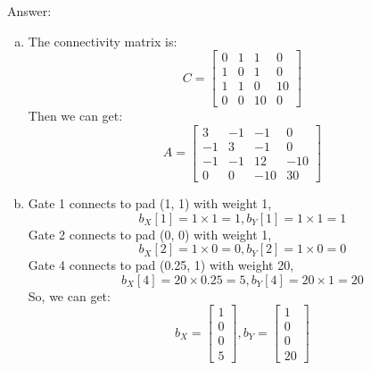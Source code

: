 \documentclass[12pt]{article}
\begin{document}
        \noindent
        Answer:

        \begin{enumerate}[(a)]
            \item The connectivity matrix is:
                \[C=
                    \left[
                        \begin{array}{cccc}
                            0 & 1 & 1 & 0\\
                            1 & 0 & 1 & 0\\
                            1 & 1 & 0 & 10\\
                            0 & 0 & 10 & 0
                        \end{array}
                    \right]
                \]
                Then we can get:
                \[A=
                    \left[
                        \begin{array}{cccc}
                            3 & -1 & -1 & 0\\
                            -1 & 3 & -1 & 0\\
                            -1 & -1 & 12 & -10\\
                            0 & 0 & -10 & 30
                        \end{array}
                    \right]
                \]
            \item
                Gate 1 connects to pad (1, 1) with weight 1,
                \[b_X[1]=1\times1=1, b_Y[1]=1\times1=1\]
                Gate 2 connects to pad (0, 0) with weight 1,
                \[b_X[2]=1\times0=0, b_Y[2]=1\times0=0\]
                Gate 4 connects to pad (0.25, 1) with weight 20,
                \[b_X[4]=20\times0.25=5, b_Y[4]=20\times1=20\]
                So, we can get:
                \[b_X=
                    \left[
                        \begin{array}{c}
                            1\\0\\0\\5
                        \end{array}
                    \right],
                b_Y=
                    \left[
                        \begin{array}{c}
                            1\\0\\0\\20
                        \end{array}
                    \right]
\]
\end{enumerate}
\end{document}
